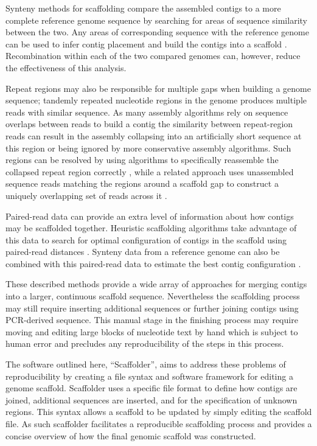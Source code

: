 \documentclass[10pt]{bmc_article}
\newenvironment{bmcformat}{\begin{raggedright}\baselineskip20pt\sloppy\setboolean{publ}{false}}{\end{raggedright}\baselineskip20pt\sloppy}
\begin{document}
\begin{bmcformat}
Synteny methods for scaffolding compare the assembled contigs to a more
complete reference genome sequence by searching for areas of sequence
similarity between the two. Any areas of corresponding sequence with the
reference genome can be used to infer contig placement and build the contigs
into a scaffold \cite{richter2007,zhao2008,assefa2009}. Recombination within
each of the two compared genomes can, however, reduce the effectiveness of this
analysis. \pb

Repeat regions may also be responsible for multiple gaps when building a genome
sequence; tandemly repeated nucleotide regions in the genome produces multiple
reads with similar sequence. As many assembly algorithms rely on sequence
overlaps between reads to build a contig the similarity between repeat-region
reads can result in the assembly collapsing into an artificially short sequence
at this region or being ignored by more conservative assembly algorithms. Such
regions can be resolved by using algorithms to specifically reassemble the
collapsed repeat region correctly \cite{mulyukov2002,koren2010}, while
a related approach uses unassembled sequence reads matching the regions around
a scaffold gap to construct a uniquely overlapping set of reads across it
\cite{tsai2010}. \pb

Paired-read data can provide an extra level of information about how contigs
may be scaffolded together. Heuristic scaffolding algorithms take advantage of
this data to search for optimal configuration of contigs in the scaffold using
paired-read distances \cite{dayarian2010,boetzer2011}. Synteny data from
a reference genome can also be combined with this paired-read data to estimate
the best contig configuration \cite{pop2004}. \pb

These described methods provide a wide array of approaches for merging contigs
into a larger, continuous scaffold sequence. Nevertheless the scaffolding
process may still require inserting additional sequences or further joining
contigs using PCR-derived sequence. This manual stage in the finishing
process may require moving and editing large blocks of nucleotide text by hand
which is subject to human error and precludes any reproducibility of the steps
in this process. \pb

The software outlined here, ``Scaffolder'', aims to address these problems of
reproducibility by creating a file syntax and software framework for editing
a genome scaffold. Scaffolder uses a specific file format to define how contigs
are joined, additional sequences are inserted, and for the specification of
unknown regions. This syntax allows a scaffold to be updated by simply editing
the scaffold file. As such scaffolder facilitates a reproducible scaffolding
process and provides a concise overview of how the final genomic scaffold was
constructed. \pb


\end{bmcformat}
\end{document}
